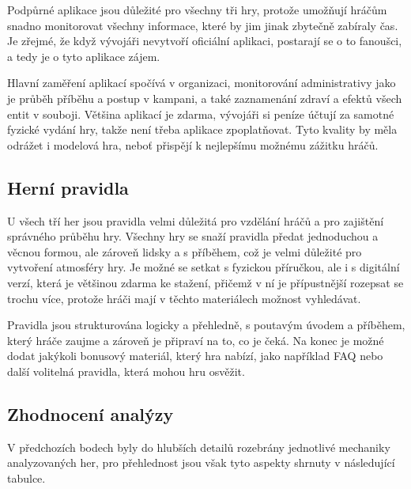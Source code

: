 Podpůrné aplikace jsou důležité pro všechny tři hry, protože umožňují hráčům snadno monitorovat všechny informace, které by jim jinak zbytečně zabíraly čas. Je zřejmé, že když vývojáři nevytvoří oficiální aplikaci, postarají se o to fanoušci, a tedy je o tyto aplikace zájem. 

Hlavní zaměření aplikací spočívá v organizaci, monitorování administrativy jako je průběh příběhu a postup v kampani, a také zaznamenání zdraví a efektů všech entit v souboji. Většina aplikací je zdarma, vývojáři si peníze účtují za samotné fyzické vydání hry, takže není třeba aplikace zpoplatňovat. Tyto kvality by měla odrážet i modelová hra, neboť přispějí k nejlepšímu možnému zážitku hráčů.

\subsection{Herní pravidla}
\label{subsec:comparison_rules}

U všech tří her jsou pravidla velmi důležitá pro vzdělání hráčů a pro zajištění správného průběhu hry. Všechny hry se snaží pravidla předat jednoduchou a věcnou formou, ale zároveň lidsky a s příběhem, což je velmi důležité pro vytvoření atmosféry hry. Je možné se setkat s fyzickou příručkou, ale i s digitální verzí, která je většinou zdarma ke stažení, přičemž v ní je přípustnější rozepsat se trochu více, protože hráči mají v těchto materiálech možnost vyhledávat.

Pravidla jsou strukturována logicky a přehledně, s poutavým úvodem a příběhem, který hráče zaujme a zároveň je připraví na to, co je čeká. Na konec je možné dodat jakýkoli bonusový materiál, který hra nabízí, jako například FAQ nebo další volitelná pravidla, která mohou hru osvěžit.

\subsection{Zhodnocení analýzy}
\label{subsec:comparison_conclusion}

V předchozích bodech byly do hlubších detailů rozebrány jednotlivé mechaniky analyzovaných her, pro přehlednost jsou však tyto aspekty shrnuty v následující tabulce.

